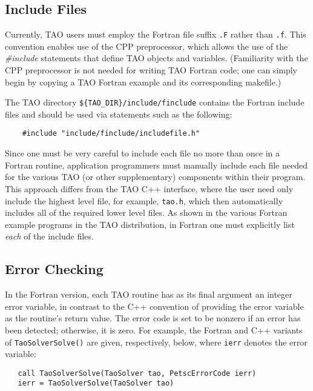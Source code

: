 \subsection{Include Files}
\label{sec:fortran_includes}


Currently, TAO users must employ the Fortran file suffix {\tt .F}
rather than {\tt .f}.  This convention enables use of the CPP
preprocessor, which allows the use of the {\em \#include} statements
that define TAO objects and variables. (Familiarity with the CPP
preprocessor is not needed for writing TAO Fortran code; one can
simply begin by copying a TAO Fortran example and its corresponding
makefile.)  

The TAO directory {\tt \$\{TAO\_DIR\}/include/finclude}
contains the Fortran include files
and should be used via statements 
such as the following:
\begin{verbatim}
    #include "include/finclude/includefile.h"
\end{verbatim}
\noindent
Since one must be very careful to include each file no more than once
in a Fortran routine, application programmers must manually include
each file needed for the various TAO (or other supplementary)
components within their program.  This approach differs from the TAO
C++ interface, where the user need only include the highest level
file, for example, {\tt tao.h}, which then automatically
includes all of the required lower level files.  As shown in the
various Fortran example programs in the TAO distribution, in Fortran
one must explicitly list {\em each} of the include files.


\subsection{Error Checking}
\label{sec:fortran_errors}

In the Fortran version, each TAO routine has as its final argument
an integer error variable, in contrast to the C++ convention of
providing the error variable as the routine's return value.  The error
code is set to be nonzero if an error has been detected; otherwise, it
is zero.  For example, the Fortran and C++ variants of {\tt TaoSolverSolve()} are
given, respectively, below, where {\tt ierr} denotes the error variable:
\begin{verbatim}
   call TaoSolverSolve(TaoSolver tao, PetscErrorCode ierr)
   ierr = TaoSolverSolve(TaoSolver tao)
\end{verbatim}
\noindent

